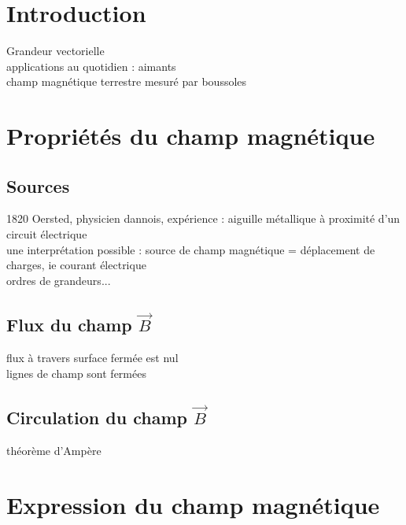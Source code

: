


\biblio{}

\section*{Introduction}
Grandeur vectorielle \\
applications au quotidien : aimants \\
champ magnétique terrestre mesuré par boussoles \\

\section{Propriétés du champ magnétique}
\subsection{Sources}
1820 Oersted, physicien dannois, expérience : aiguille métallique à proximité d'un circuit électrique \\
une interprétation possible : source de champ magnétique = déplacement de charges, ie courant électrique \\
ordres de grandeurs... \\

\subsection{Flux du champ $\vec{B}$}
flux à travers surface fermée est nul \\
lignes de champ sont fermées \\
\subsection{Circulation du champ $\vec{B}$}
théorème d'Ampère \\

\section{Expression du champ magnétique}

